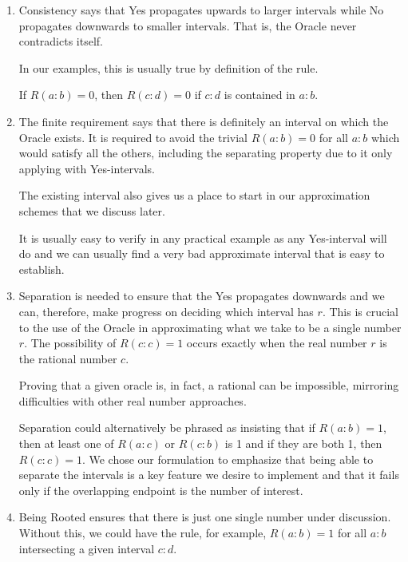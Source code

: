 \documentclass[12pt]{article}
\theoremstyle{remark}
\begin{document}
\begin{enumerate}

    \item Consistency says that Yes propagates upwards to larger intervals while No propagates downwards to smaller intervals. That is, the Oracle never contradicts itself. 
    
    In our examples, this is usually true by definition of the rule. 
    
    If $R(a:b)= 0$, then $R(c:d)=0$ if $c:d$ is contained in $a:b$.

    \item The finite requirement says that there is definitely an interval on which the Oracle exists. It is required to avoid the trivial $R(a:b) = 0$ for all $a:b$ which would satisfy all the others, including the separating property due to it only applying with Yes-intervals. 
    
    The existing interval also gives us a place to start in our approximation schemes that we discuss later. 
    
    It is usually easy to verify in any practical example as any Yes-interval will do and we can usually find a very bad approximate interval that is easy to establish.  

    \item Separation is needed to ensure that the Yes propagates downwards and we can, therefore, make progress on deciding which interval has $r$. This is crucial to the use of the Oracle in approximating what we take to be a single number $r$. The possibility of $R(c:c) = 1$ occurs exactly when the real number $r$ is the rational number $c$. 
    
    Proving that a given oracle is, in fact, a rational can be impossible, mirroring difficulties with other real number approaches. 

    Separation could alternatively be phrased as insisting that if $R(a:b) = 1$, then at least one of $R(a:c)$ or $R(c:b)$ is 1 and if they are both 1, then $R(c:c) = 1$. We chose our formulation to emphasize that being able to separate the intervals is a key feature we desire to implement and that it fails only if the overlapping endpoint is the number of interest. 
    
    \item Being Rooted ensures that there is just one single number under discussion. Without this, we could have the rule, for example, $R(a:b) = 1$ for all $a:b$ intersecting a given interval $c:d$. 
    

\end{enumerate}
\end{document}

